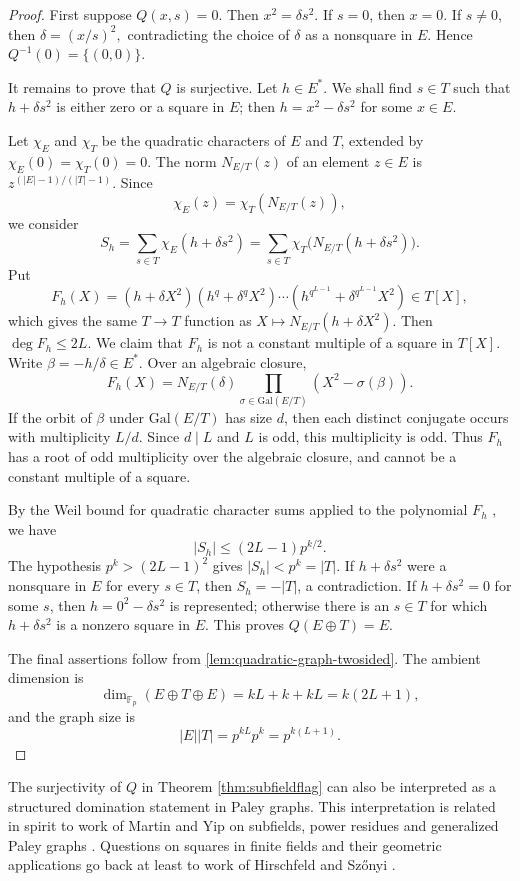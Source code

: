 \documentclass[11pt]{article}
\newcommand{\F}{\mathbb F}
\begin{document}
	\begin{proof}
		First suppose $Q(x,s)=0$.  Then
		$ x^2=\delta s^2.$
		If $s=0$, then $x=0$.  If $s\ne0$, then
		$\delta=(x/s)^2,$ 
		contradicting the choice of $\delta$ as a nonsquare in $E$.  Hence
		$Q^{-1}(0)=\{(0,0)\}$.
		
		It remains to prove that $Q$ is surjective.  Let $h\in E^*$.  We shall find
		$s\in T$ such that $h+\delta s^2$ is either zero or a square in $E$; then
		$h=x^2-\delta s^2$ for some $x\in E$.
		
		Let $\chi_E$ and $\chi_T$ be the quadratic characters of $E$ and $T$, extended
		by $\chi_E(0)=\chi_T(0)=0$. The norm $N_{E/T}(z)$ of an element $z\in E$ is $z^{(|E|-1)/(|T|-1)}$. Since
		\[
		\chi_E(z)=\chi_T(N_{E/T}(z)),
		\]
		we consider
		\[
		S_h=\sum_{s\in T}\chi_E(h+\delta s^2)
		=\sum_{s\in T}\chi_T\bigl(N_{E/T}(h+\delta s^2)\bigr).
		\]
		Put
		\[
		F_h(X)=(h+\delta X^2)(h^q+\delta^q X^2)\cdots (h^{q^{L-1}}+\delta^{q^{L-1}}X^2) \in T[X],
		\]
		which gives the same $T \rightarrow T$ function as $X \mapsto N_{E/T}(h+\delta X^2)$. 
		Then $\deg F_h\le2L$.  We claim that $F_h$ is not a constant multiple of a
		square in $T[X]$.  Write $\beta=-h/\delta\in E^*$. Over an algebraic closure,
		\[
		F_h(X)=N_{E/T}(\delta)
		\prod_{\sigma\in\mathrm{Gal}(E/T)}(X^2-\sigma(\beta)).
		\]
		If the orbit of $\beta$ under $\mathrm{Gal}(E/T)$ has size $d$, then each
		distinct conjugate occurs with multiplicity $L/d$.  Since $d\mid L$ and $L$ is
		odd, this multiplicity is odd.  Thus $F_h$ has a root of odd multiplicity over
		the algebraic closure, and cannot be a constant multiple of a square.
		
		By the Weil bound for quadratic character sums applied to the 
		polynomial $F_h$ \cite[Theorem~5.41]{LidlNiederreiter1997}, we have
		\[
		|S_h|\le (2L-1)p^{k/2} .
		\]
		The hypothesis $p^k>(2L-1)^2$ gives $|S_h|<p^k=|T|$.  If $h+\delta s^2$ were a
		nonsquare in $E$ for every $s\in T$, then $S_h=-|T|$, a contradiction.  If
		$h+\delta s^2=0$ for some $s$, then $h=0^2-\delta s^2$ is represented; otherwise
		there is an $s\in T$ for which $h+\delta s^2$ is a nonzero square in $E$.  This
		proves $Q(E\oplus T)=E$.
		
		The final assertions follow from \cref{lem:quadratic-graph-twosided}.  The
		ambient dimension is
		\[
		\dim_{\F_p}(E\oplus T\oplus E)=kL+k+kL=k(2L+1),
		\]
		and the graph size is
		\[
		|E||T|=p^{kL}p^k=p^{k(L+1)}.
		\]
	\end{proof}
	
	The surjectivity of $Q$ in Theorem \ref{thm:subfieldflag} can also be
	interpreted as a structured domination statement in Paley graphs.  This
	interpretation is related in spirit to work of Martin and Yip on
	subfields, power residues and generalized Paley graphs
	\cite{MartinYip2025}.  Questions on squares in finite fields and
	their geometric applications go back at least to work of Hirschfeld and
	Sz\H{o}nyi \cite{HirschfeldSzonyi1991}.
	
\end{document}
